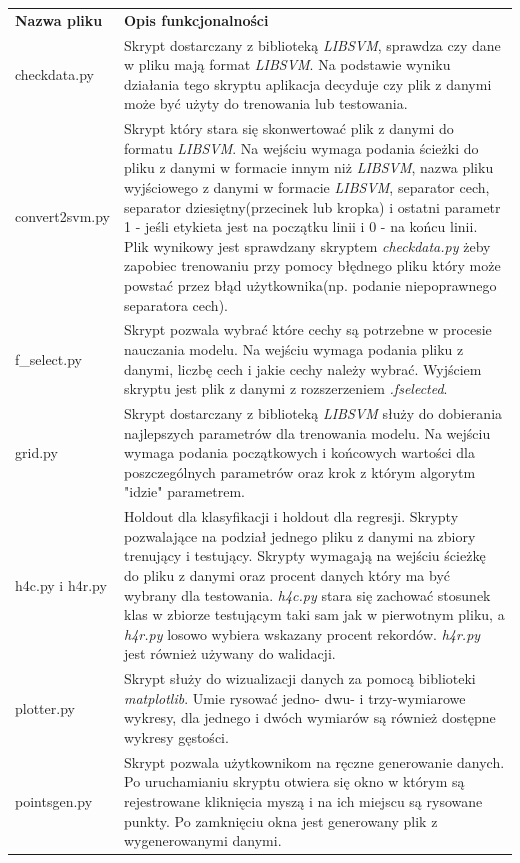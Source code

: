 \documentclass[paper=a4, fontsize=11pt]{scrartcl} %
\numberwithin{equation}{section} %
\numberwithin{figure}{section} %
\begin{document}
    \begingroup
    \setlength{\tabcolsep}{10pt} %
    \renewcommand{\arraystretch}{1.5}
    \begin{tabular}{p{}p{}} %
        \textbf{Nazwa pliku} & \textbf{Opis funkcjonalności} \\ %
        checkdata.py & 
        Skrypt dostarczany z biblioteką \textit{LIBSVM}, sprawdza czy dane w pliku mają format
        \textit{LIBSVM}. Na podstawie wyniku działania tego skryptu aplikacja decyduje czy plik
        z danymi może być użyty do trenowania lub testowania.
        \\ %
        convert2svm.py &
        Skrypt który stara się skonwertować plik z danymi do formatu \textit{LIBSVM}. Na
        wejściu wymaga podania ścieżki do pliku z danymi w formacie innym niż \textit{LIBSVM},
        nazwa pliku wyjściowego z danymi w formacie \textit{LIBSVM}, separator cech, separator
        dziesiętny(przecinek lub kropka) i ostatni parametr 1 - jeśli etykieta jest na początku
        linii i 0 - na końcu linii. Plik wynikowy jest sprawdzany skryptem
        \textit{checkdata.py} żeby zapobiec trenowaniu przy pomocy błędnego pliku który może
        powstać przez błąd użytkownika(np. podanie niepoprawnego separatora cech).
        \\ %
        f\_select.py &
        Skrypt pozwala wybrać które cechy są potrzebne w procesie nauczania modelu. Na wejściu
        wymaga podania pliku z danymi, liczbę cech i jakie cechy należy wybrać. Wyjściem
        skryptu jest plik z danymi z rozszerzeniem \textit{.fselected}.
        \\ %
        grid.py & 
        Skrypt dostarczany z biblioteką \textit{LIBSVM} służy do dobierania najlepszych
        parametrów dla trenowania modelu. Na wejściu wymaga podania początkowych i końcowych
        wartości dla poszczególnych parametrów oraz krok z którym algorytm "idzie" parametrem.
        \\ %
        h4c.py i h4r.py &
        Holdout dla klasyfikacji i holdout dla regresji. Skrypty pozwalające na podział jednego
        pliku z danymi na zbiory trenujący i testujący. Skrypty wymagają na wejściu ścieżkę do
        pliku z danymi oraz procent danych który ma być wybrany dla testowania. \textit{h4c.py}
        stara się zachować stosunek klas w zbiorze testującym taki sam jak w pierwotnym pliku,
        a \textit{h4r.py} losowo wybiera wskazany procent rekordów. \textit{h4r.py} jest
        również używany do walidacji.
        \\ %
        plotter.py & 
        Skrypt służy do wizualizacji danych za pomocą biblioteki \textit{matplotlib}. Umie
        rysować jedno- dwu- i trzy-wymiarowe wykresy, dla jednego i dwóch wymiarów są również
        dostępne wykresy gęstości.
        \\ %
        pointsgen.py & 
        Skrypt pozwala użytkownikom na ręczne generowanie danych. Po uruchamianiu skryptu
        otwiera się okno w którym są rejestrowane kliknięcia myszą i na ich miejscu są rysowane
        punkty. Po zamknięciu okna jest generowany plik z wygenerowanymi danymi.
        \\ %
    \end{tabular}
\end{document}
